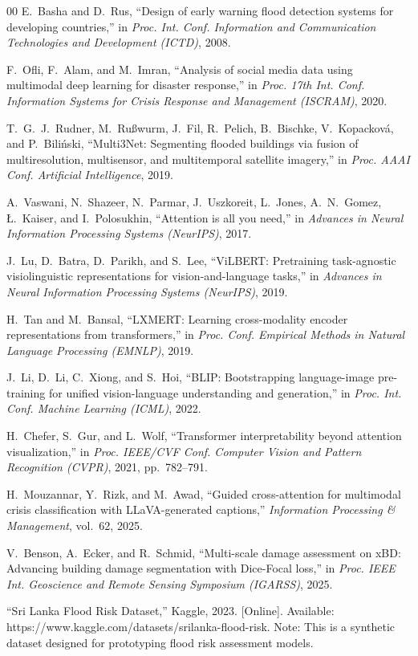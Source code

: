 \documentclass[journal]{IEEEtran}
\begin{document}
\begin{thebibliography}{00}
E.~Basha and D.~Rus, ``Design of early warning flood detection systems for developing countries,'' in \textit{Proc. Int. Conf. Information and Communication Technologies and Development (ICTD)}, 2008.

F.~Ofli, F.~Alam, and M.~Imran, ``Analysis of social media data using multimodal deep learning for disaster response,'' in \textit{Proc. 17th Int. Conf. Information Systems for Crisis Response and Management (ISCRAM)}, 2020.

T.~G.~J.~Rudner, M.~Ru\ss wurm, J.~Fil, R.~Pelich, B.~Bischke, V.~Kopackov\'{a}, and P.~Bili\'{n}ski, ``Multi3Net: Segmenting flooded buildings via fusion of multiresolution, multisensor, and multitemporal satellite imagery,'' in \textit{Proc. AAAI Conf. Artificial Intelligence}, 2019.

A.~Vaswani, N.~Shazeer, N.~Parmar, J.~Uszkoreit, L.~Jones, A.~N.~Gomez, \L.~Kaiser, and I.~Polosukhin, ``Attention is all you need,'' in \textit{Advances in Neural Information Processing Systems (NeurIPS)}, 2017.

J.~Lu, D.~Batra, D.~Parikh, and S.~Lee, ``ViLBERT: Pretraining task-agnostic visiolinguistic representations for vision-and-language tasks,'' in \textit{Advances in Neural Information Processing Systems (NeurIPS)}, 2019.

H.~Tan and M.~Bansal, ``LXMERT: Learning cross-modality encoder representations from transformers,'' in \textit{Proc. Conf. Empirical Methods in Natural Language Processing (EMNLP)}, 2019.

J.~Li, D.~Li, C.~Xiong, and S.~Hoi, ``BLIP: Bootstrapping language-image pre-training for unified vision-language understanding and generation,'' in \textit{Proc. Int. Conf. Machine Learning (ICML)}, 2022.

H.~Chefer, S.~Gur, and L.~Wolf, ``Transformer interpretability beyond attention visualization,'' in \textit{Proc. IEEE/CVF Conf. Computer Vision and Pattern Recognition (CVPR)}, 2021, pp.~782--791.

H.~Mouzannar, Y.~Rizk, and M.~Awad, ``Guided cross-attention for multimodal crisis classification with LLaVA-generated captions,'' \textit{Information Processing \& Management}, vol.~62, 2025.

V.~Benson, A.~Ecker, and R.~Schmid, ``Multi-scale damage assessment on xBD: Advancing building damage segmentation with Dice-Focal loss,'' in \textit{Proc. IEEE Int. Geoscience and Remote Sensing Symposium (IGARSS)}, 2025.

``Sri Lanka Flood Risk Dataset,'' Kaggle, 2023. [Online]. Available: https://www.kaggle.com/datasets/srilanka-flood-risk. Note: This is a synthetic dataset designed for prototyping flood risk assessment models.

\end{thebibliography}
\end{document}

